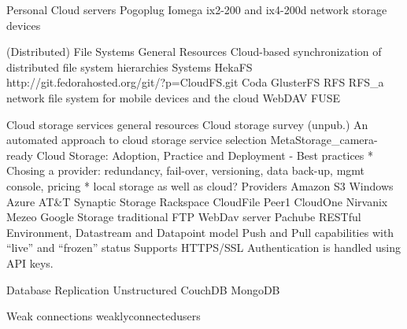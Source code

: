 		Personal Cloud servers		
			Pogoplug
			Iomega
				ix2-200 and ix4-200d network storage devices

	(Distributed) File Systems
		General Resources
			Cloud-based synchronization of distributed file system hierarchies
		Systems
			HekaFS
			http://git.fedorahosted.org/git/?p=CloudFS.git 
			Coda
			GlusterFS
			RFS
				RFS_a network file system for mobile devices and the cloud
		WebDAV 
		FUSE		

	Cloud storage services
		general resources
			Cloud storage survey (unpub.)
			An automated approach to cloud storage service selection
			MetaStorage_camera-ready
			Cloud Storage: Adoption, Practice and Deployment
				- Best practices
					* Chosing a provider: redundancy, fail-over, versioning, data back-up, mgmt console, pricing
					* local storage as well as cloud?
		Providers
			Amazon S3
			Windows Azure
			AT&T Synaptic Storage
			Rackspace CloudFile
			Peer1 CloudOne
			Nirvanix
			Mezeo
			Google Storage
			traditional FTP
			WebDav server
			Pachube
				RESTful
				Environment, Datastream and Datapoint model
				Push and Pull capabilities with ``live'' and ``frozen'' status
				Supports HTTPS/SSL
				Authentication is handled using API keys.


	Database Replication
		Unstructured
			CouchDB
			MongoDB

	Weak connections
		weaklyconnectedusers